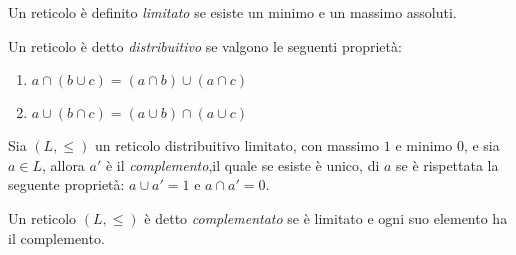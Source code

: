\begin{defi}
    Un reticolo è definito \emph{limitato} se esiste un minimo e un massimo assoluti.
\end{defi}

\begin{defi}
    Un reticolo è detto \emph{distribuitivo} se valgono le seguenti proprietà:
\end{defi}
\begin{enumerate}
    \item $a \cap (b \cup c) = (a \cap b) \cup (a \cap c)$
    \item $a \cup (b \cap c) = (a \cup b) \cap (a \cup c)$
\end{enumerate}

\begin{defi}
    Sia $(L,\leq)$ un reticolo distribuitivo limitato, con massimo $1$ e minimo $0$,
e sia $a \in L$, allora $a'$ è il \emph{complemento},il quale se esiste è unico,
 di $a$ se è rispettata la seguente proprietà: $a \cup a' = 1$ e $a \cap a' = 0$.
\end{defi}

\begin{defi}
Un reticolo $(L,\leq)$ è detto \emph{complementato} se è limitato e ogni suo elemento ha il complemento.
\end{defi}
